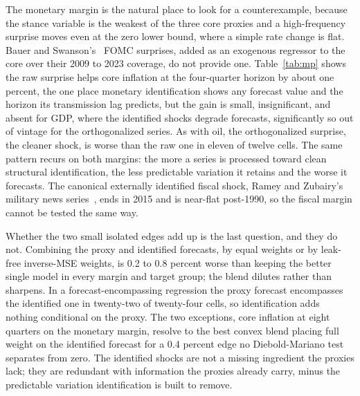 \documentclass[conference]{IEEEtran}
\begin{document}
The monetary margin is the natural place to look for a counterexample, because the stance variable is the weakest of the three core proxies and a high-frequency surprise moves even at the zero lower bound, where a simple rate change is flat. Bauer and Swanson's~\cite{bauerswanson2023} FOMC surprises, added as an exogenous regressor to the core over their 2009 to 2023 coverage, do not provide one. Table~\ref{tab:mp} shows the raw surprise helps core inflation at the four-quarter horizon by about one percent, the one place monetary identification shows any forecast value and the horizon its transmission lag predicts, but the gain is small, insignificant, and absent for GDP, where the identified shocks degrade forecasts, significantly so out of vintage for the orthogonalized series. As with oil, the orthogonalized surprise, the cleaner shock, is worse than the raw one in eleven of twelve cells. The same pattern recurs on both margins: the more a series is processed toward clean structural identification, the less predictable variation it retains and the worse it forecasts. The canonical externally identified fiscal shock, Ramey and Zubairy's military news series~\cite{ramey2011}, ends in 2015 and is near-flat post-1990, so the fiscal margin cannot be tested the same way.

Whether the two small isolated edges add up is the last question, and they do not. Combining the proxy and identified forecasts, by equal weights or by leak-free inverse-MSE weights, is 0.2 to 0.8 percent worse than keeping the better single model in every margin and target group; the blend dilutes rather than sharpens. In a forecast-encompassing regression the proxy forecast encompasses the identified one in twenty-two of twenty-four cells, so identification adds nothing conditional on the proxy. The two exceptions, core inflation at eight quarters on the monetary margin, resolve to the best convex blend placing full weight on the identified forecast for a 0.4 percent edge no Diebold-Mariano test separates from zero. The identified shocks are not a missing ingredient the proxies lack; they are redundant with information the proxies already carry, minus the predictable variation identification is built to remove.
\end{document}
